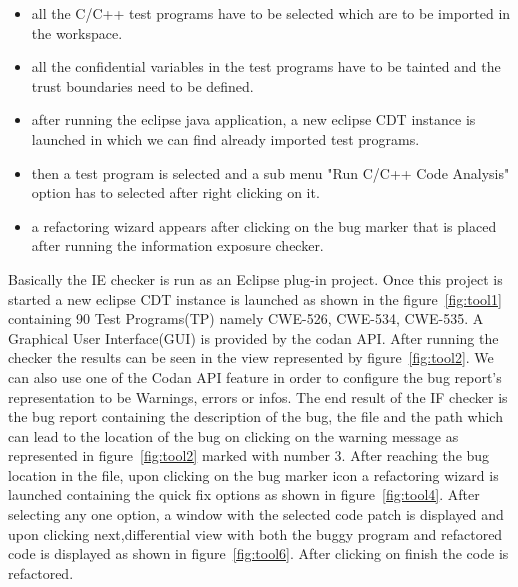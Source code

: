 \begin{itemize}
 \item  all the C/C++ test programs have to be selected which are to be imported
in the workspace.
\item  all the confidential variables in the test
programs have to be tainted and the trust boundaries need to be defined.
\item  after running the eclipse java application, a new eclipse CDT instance
is launched in which we can find already imported test programs.
\item then a test
program is selected and a sub menu "Run C/C++ Code Analysis" option
has to selected after right clicking on it.
\item a refactoring wizard
appears after clicking on the bug marker that is placed after running the
information exposure checker.
\end{itemize}

Basically the IE checker is run as an Eclipse
plug-in project. Once this project is started a new eclipse CDT instance is 
launched as shown in the figure~\ref{fig:tool1} containing 90 Test Programs(TP)
namely CWE-526, CWE-534, CWE-535. A Graphical User Interface(GUI) is provided by the codan API.
After running the checker the results can be seen in the view represented
by figure~\ref{fig:tool2}. We can also use one of the Codan API feature in order
to configure the bug report's representation to be Warnings, errors or infos.
The end result of the IF checker is the bug report containing the description
of the bug, the file and the path which can lead to the location of the bug on 
clicking
on the warning message as represented in figure~\ref{fig:tool2} marked with number 3.
After reaching the bug location in the file, upon clicking on the bug marker icon
a refactoring wizard is launched containing the quick fix options as shown in 
figure~\ref{fig:tool4}. After selecting any one option, a window with the selected
code patch is displayed and upon clicking next,differential view with
both the buggy program and refactored code is displayed as shown in 
figure~\ref{fig:tool6}. After clicking on finish the code is refactored.



\label{chapter:Algorithm}


